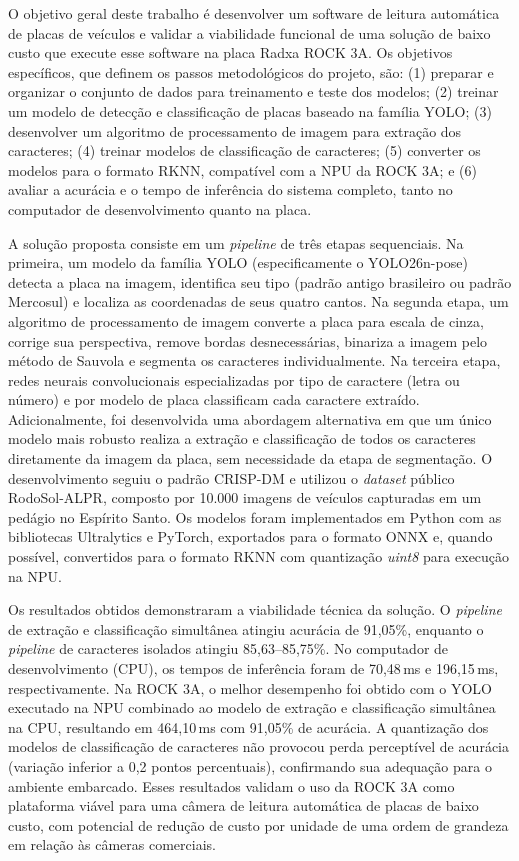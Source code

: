 O objetivo geral deste trabalho é desenvolver um software de leitura automática de placas de veículos e validar a viabilidade funcional de uma solução de baixo custo que execute esse software na placa Radxa ROCK 3A. Os objetivos específicos, que definem os passos metodológicos do projeto, são: (1) preparar e organizar o conjunto de dados para treinamento e teste dos modelos; (2) treinar um modelo de detecção e classificação de placas baseado na família YOLO; (3) desenvolver um algoritmo de processamento de imagem para extração dos caracteres; (4) treinar modelos de classificação de caracteres; (5) converter os modelos para o formato RKNN, compatível com a NPU da ROCK 3A; e (6) avaliar a acurácia e o tempo de inferência do sistema completo, tanto no computador de desenvolvimento quanto na placa.

A solução proposta consiste em um \textit{pipeline} de três etapas sequenciais. Na primeira, um modelo da família YOLO (especificamente o YOLO26n-pose) detecta a placa na imagem, identifica seu tipo (padrão antigo brasileiro ou padrão Mercosul) e localiza as coordenadas de seus quatro cantos. Na segunda etapa, um algoritmo de processamento de imagem converte a placa para escala de cinza, corrige sua perspectiva, remove bordas desnecessárias, binariza a imagem pelo método de Sauvola e segmenta os caracteres individualmente. Na terceira etapa, redes neurais convolucionais especializadas por tipo de caractere (letra ou número) e por modelo de placa classificam cada caractere extraído. Adicionalmente, foi desenvolvida uma abordagem alternativa em que um único modelo mais robusto realiza a extração e classificação de todos os caracteres diretamente da imagem da placa, sem necessidade da etapa de segmentação. O desenvolvimento seguiu o padrão CRISP-DM e utilizou o \textit{dataset} público RodoSol-ALPR, composto por 10.000 imagens de veículos capturadas em um pedágio no Espírito Santo. Os modelos foram implementados em Python com as bibliotecas Ultralytics e PyTorch, exportados para o formato ONNX e, quando possível, convertidos para o formato RKNN com quantização \textit{uint8} para execução na NPU.

Os resultados obtidos demonstraram a viabilidade técnica da solução. O \textit{pipeline} de extração e classificação simultânea atingiu acurácia de 91,05\%, enquanto o \textit{pipeline} de caracteres isolados atingiu 85,63--85,75\%. No computador de desenvolvimento (CPU), os tempos de inferência foram de 70,48\,ms e 196,15\,ms, respectivamente. Na ROCK 3A, o melhor desempenho foi obtido com o YOLO executado na NPU combinado ao modelo de extração e classificação simultânea na CPU, resultando em 464,10\,ms com 91,05\% de acurácia. A quantização dos modelos de classificação de caracteres não provocou perda perceptível de acurácia (variação inferior a 0,2 pontos percentuais), confirmando sua adequação para o ambiente embarcado. Esses resultados validam o uso da ROCK 3A como plataforma viável para uma câmera de leitura automática de placas de baixo custo, com potencial de redução de custo por unidade de uma ordem de grandeza em relação às câmeras comerciais.

